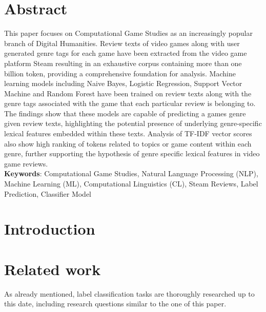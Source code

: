 \documentclass[11pt, a4paper]{article}
\begin{document}
\thispagestyle{empty}\clearpage

\section*{Abstract}
This paper focuses on Computational Game Studies as an increasingly popular branch of Digital Humanities. Review texts of video games along with user generated genre tags for each game have been extracted from the video game platform Steam resulting in an exhaustive corpus containing more than one billion token, providing a comprehensive foundation for analysis. Machine learning models including Naive Bayes, Logistic Regression, Support Vector Machine and Random Forest have been trained on review texts along with the genre tags associated with the game that each particular review is belonging to. The findings show that these models are capable of predicting a games genre given review texts, highlighting the potential presence of underlying genre-specific lexical features embedded within these texts. Analysis of TF-IDF vector scores also show high ranking of tokens related to topics or game content within each genre, further supporting the hypothesis of genre specific lexical features in video game reviews.\\

\noindent\textbf{Keywords}: Computational Game Studies, Natural Language Processing (NLP), Machine Learning (ML), Computational Linguistics (CL), Steam Reviews, Label Prediction, Classifier Model
\clearpage


\clearpage
\tableofcontents\vspace{2\baselineskip}\clearpage
\listoftables\vspace{2\baselineskip}\clearpage
\listoffigures\clearpage

\clearpage\section{Introduction}\label{sec:introduction}


\section{Related work}\label{sec:related-work}
As already mentioned, label classification tasks are thoroughly researched up to this date, including research
questions similar to the one of this paper.
\end{document}
